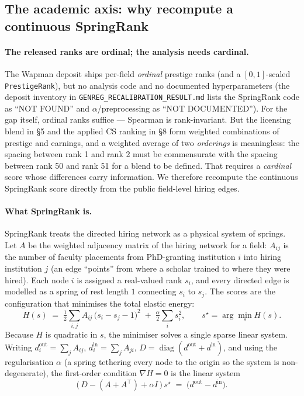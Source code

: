 \documentclass[11pt]{article}
\begin{document}
\subsection{The academic axis: why recompute a continuous SpringRank}

\paragraph{The released ranks are ordinal; the analysis needs cardinal.} The Wapman deposit ships per-field \emph{ordinal} prestige ranks (and a $[0,1]$-scaled \texttt{PrestigeRank}), but no analysis code and no documented hyperparameters (the deposit inventory in \texttt{GENREG\_RECALIBRATION\_RESULT.md} lists the SpringRank code as ``NOT FOUND'' and $\alpha$/preprocessing as ``NOT DOCUMENTED''). For the gap itself, ordinal ranks suffice --- Spearman is rank-invariant. But the licensing blend in \S5 and the applied CS ranking in \S8 form weighted combinations of prestige and earnings, and a weighted average of two \emph{orderings} is meaningless: the spacing between rank 1 and rank 2 must be commensurate with the spacing between rank 50 and rank 51 for a blend to be defined. That requires a \emph{cardinal} score whose differences carry information. We therefore recompute the continuous SpringRank score \citep{debacco2018physical} directly from the public field-level hiring edges.

\paragraph{What SpringRank is.} SpringRank treats the directed hiring network as a physical system of springs. Let $A$ be the weighted adjacency matrix of the hiring network for a field: $A_{ij}$ is the number of faculty placements from PhD-granting institution $i$ into hiring institution $j$ (an edge ``points'' from where a scholar trained to where they were hired). Each node $i$ is assigned a real-valued rank $s_i$, and every directed edge is modelled as a spring of rest length $1$ connecting $s_i$ to $s_j$. The scores are the configuration that minimises the total elastic energy:
\[
H(s) \;=\; \tfrac{1}{2}\sum_{i,j} A_{ij}\,\bigl(s_i - s_j - 1\bigr)^2 \;+\; \tfrac{\alpha}{2}\sum_i s_i^2,
\qquad
s^\star = \arg\min_s H(s).
\]
Because $H$ is quadratic in $s$, the minimiser solves a single sparse linear system. Writing $d^{\text{out}}_i = \sum_j A_{ij}$, $d^{\text{in}}_i = \sum_j A_{ji}$, $D = \operatorname{diag}(d^{\text{out}} + d^{\text{in}})$, and using the regularisation $\alpha$ (a spring tethering every node to the origin so the system is non-degenerate), the first-order condition $\nabla H = 0$ is the linear system
\[
\bigl(\,D - (A + A^{\!\top}) + \alpha I\,\bigr)\, s^\star \;=\; \bigl(d^{\text{out}} - d^{\text{in}}\bigr).
\]
\end{document}
